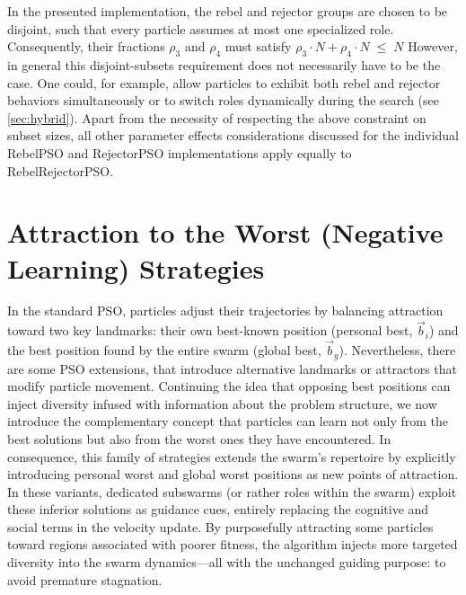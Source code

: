 {In the presented implementation, the rebel and rejector groups are chosen to be disjoint, such that every particle assumes at most one specialized role. Consequently, their fractions 
$\rho_{3}$ and $\rho_{4}$
  must satisfy
$\rho_{3} \cdot N + \rho_{4} \cdot N \;\le\; N$
However, in general this disjoint-subsets requirement does not necessarily have to be the case. One could, for example, allow particles to exhibit both rebel and rejector behaviors simultaneously or to switch roles dynamically during the search (see \autoref{sec:hybrid}). Apart from the necessity of respecting the above constraint on subset sizes, all other parameter effects considerations discussed for the individual RebelPSO and RejectorPSO implementations apply equally to RebelRejectorPSO.







\section{Attraction to the Worst (Negative Learning) Strategies}\label{sec:negative}

In the standard PSO, particles adjust their trajectories by balancing attraction toward two key landmarks: their own best-known position (personal best, $\vec{b}_i$) and the best position found by the entire swarm (global best, $\vec{b}_g$). Nevertheless, there are some PSO extensions, that introduce alternative landmarks or attractors that modify particle movement.
Continuing the idea that opposing best positions can inject diversity infused with information about the problem structure, we now introduce the complementary concept that particles can learn not only from the best solutions but also from the worst ones they have encountered. In consequence, this family of strategies extends the swarm's repertoire by explicitly introducing personal worst and global worst positions as new points of attraction.
In these variants, dedicated subswarms (or rather roles within the swarm) exploit these inferior solutions as guidance cues, entirely replacing the cognitive and social terms in the velocity update.
By purposefully attracting some particles toward regions associated with poorer fitness, the algorithm injects more targeted diversity into the swarm dynamics---all with the unchanged guiding purpose: to avoid premature stagnation.


}
